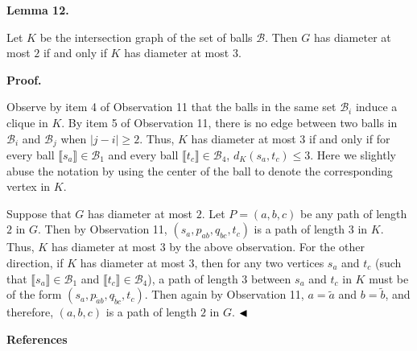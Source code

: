 \documentclass[10pt,a4paper]{article}
\begin{document}
\par\medskip\noindent\textbf{Lemma 12.}\par
Let $K$ be the intersection graph of the set of balls $\mathcal{B}$. Then $G$ has diameter at most $2$ if and only if $K$ has diameter at most $3$.
\par
\par
\par
\par\medskip\noindent\textbf{Proof.}\par
Observe by item 4 of Observation 11 that the balls in the same set $\mathcal{B}_{i}$ induce a clique in $K$. By item 5 of Observation 11, there is no edge between two balls in $\mathcal{B}_{i}$ and $\mathcal{B}_{j}$ when $|j-i|\geq 2$. Thus, $K$ has diameter at most $3$ if and only if for every ball $\llbracket s_{a}\rrbracket\in\mathcal{B}_{1}$ and every ball $\llbracket t_{c}\rrbracket\in\mathcal{B}_{4}$, $d_{K}(s_{a},t_{c})\leq 3$. Here we slightly abuse the notation by using the center of the ball to denote the corresponding vertex in $K$.
\par
\par
Suppose that $G$ has diameter at most $2$. Let $P=(a,b,c)$ be any path of length $2$ in $G$. Then by Observation 11, $(s_{a},p_{ab},q_{bc},t_{c})$ is a path of length 3 in $K$. Thus, $K$ has diameter at most 3 by the above observation. For the other direction, if $K$ has diameter at most $3$, then for any two vertices $s_{a}$ and $t_{c}$ (such that $\llbracket s_{a}\rrbracket\in\mathcal{B}_{1}$ and $\llbracket t_{c}\rrbracket\in\mathcal{B}_{4}$), a path of length 3 between $s_{a}$ and $t_{c}$ in $K$ must be of the form $(s_{a},p_{\tilde{a}b},q_{\tilde{b}c},t_{c})$. Then again by Observation 11, $a=\tilde{a}$ and $b=\tilde{b}$, and therefore, $(a,b,c)$ is a path of length $2$ in $G$. $\hfill\blacktriangleleft$
\par
\par
\par\medskip\noindent\textbf{References}\par
\end{document}
